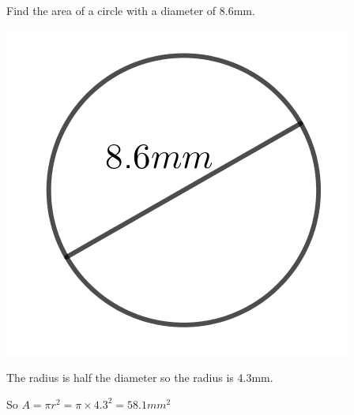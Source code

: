 \begin{exmp}
Find the area of a circle with a diameter of 8.6mm.

\bigskip

\includegraphics{./Images/Measurement/CircleAreaEg2.png}

\bigskip

The radius is half the diameter so the radius is 4.3mm.

\bigskip

So $A = \pi r^2 = \pi \times 4.3^2 = 58.1 mm^2$

\end{exmp}

